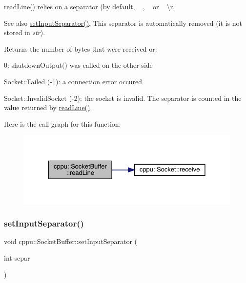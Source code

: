 \mbox{\hyperlink{classcppu_1_1_socket_buffer_a222769d3776b9cbd3a727ee1f0e60358}{read\+Line()}} relies on a separator (by default, ~\newline
, ~\newline
 or ~\newline
\textbackslash{}r, \begin{DoxySeeAlso}{See also}
\mbox{\hyperlink{classcppu_1_1_socket_buffer_acadf4540c1e3eba67b014753b84b482c}{set\+Input\+Separator()}}. This separator is automatically removed (it is not stored in {\itshape str}).
\end{DoxySeeAlso}
\begin{DoxyReturn}{Returns}
the number of bytes that were received or\+:
\begin{DoxyItemize}
\item 0\+: shutdown\+Output() was called on the other side
\item Socket\+::\+Failed (-\/1)\+: a connection error occured
\item Socket\+::\+Invalid\+Socket (-\/2)\+: the socket is invalid. The separator is counted in the value returned by \mbox{\hyperlink{classcppu_1_1_socket_buffer_a222769d3776b9cbd3a727ee1f0e60358}{read\+Line()}}. 
\end{DoxyItemize}
\end{DoxyReturn}
Here is the call graph for this function\+:
\nopagebreak
\begin{figure}[H]
\begin{center}
\leavevmode
\includegraphics[width=328pt]{classcppu_1_1_socket_buffer_a222769d3776b9cbd3a727ee1f0e60358_cgraph}
\end{center}
\end{figure}
\mbox{\label{classcppu_1_1_socket_buffer_acadf4540c1e3eba67b014753b84b482c}} 
\subsubsection{\texorpdfstring{setInputSeparator()}{setInputSeparator()}}
{\footnotesize\ttfamily void cppu\+::\+Socket\+Buffer\+::set\+Input\+Separator (\begin{DoxyParamCaption}\item[{int}]{separ }\end{DoxyParamCaption})\hspace{0.3cm}{\ttfamily [virtual]}}



